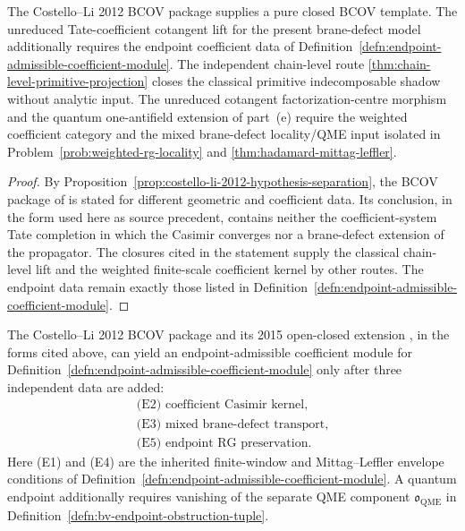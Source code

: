 \begin{cor}
\label{cor:costello-li-input-coefficient-endpoint}
  The Costello--Li 2012 BCOV package supplies a pure closed BCOV
  template.  The unreduced Tate-coefficient cotangent lift
  for the present brane-defect model additionally requires the endpoint
  coefficient data of
  Definition~\ref{defn:endpoint-admissible-coefficient-module}.  The
  independent chain-level route
  \ref{thm:chain-level-primitive-projection} closes the classical
  primitive indecomposable shadow without analytic input.  The
  unreduced cotangent factorization-centre morphism and the
  quantum one-antifield extension of part~(e) require the
  weighted coefficient category and the mixed brane-defect
  locality/QME input isolated in
  Problem~\ref{prob:weighted-rg-locality} and
  \ref{thm:hadamard-mittag-leffler}.
\end{cor}

\begin{proof}
  By Proposition~\ref{prop:costello-li-2012-hypothesis-separation}, the
  BCOV package of \cite{costello-li-quantum-bcov} is stated
  for different geometric and coefficient data.  Its conclusion, in the
  form used here as source precedent, contains
  neither the coefficient-system Tate completion in which the Casimir
  converges nor a brane-defect extension of the propagator.  The closures
  cited in the statement supply the classical chain-level lift and the
  weighted finite-scale coefficient kernel by other routes.  The endpoint
  data remain exactly those listed in
  Definition~\ref{defn:endpoint-admissible-coefficient-module}.
\end{proof}

\begin{thm}
\label{thm:costello-li-no-coefficient-endpoint}
  The Costello--Li 2012 BCOV package
  \cite{costello-li-quantum-bcov} and its 2015 open-closed extension
  \cite{costello-li-open-closed-bcov}, in the forms cited above, can
  yield an endpoint-admissible coefficient module for
  Definition~\ref{defn:endpoint-admissible-coefficient-module} only after
  three independent data are added:
  \[
  \begin{gathered}
    \text{(E2) coefficient Casimir kernel},\\
    \text{(E3) mixed brane-defect transport},\\
    \text{(E5) endpoint RG preservation}.
  \end{gathered}
  \]
  Here (E1) and (E4) are the inherited finite-window and Mittag--Leffler
  envelope conditions of
  Definition~\ref{defn:endpoint-admissible-coefficient-module}.  A
  quantum endpoint additionally requires vanishing of the separate QME
  component \(\mathfrak o_{\mathrm{QME}}\) in
  Definition~\ref{defn:bv-endpoint-obstruction-tuple}.
\end{thm}

